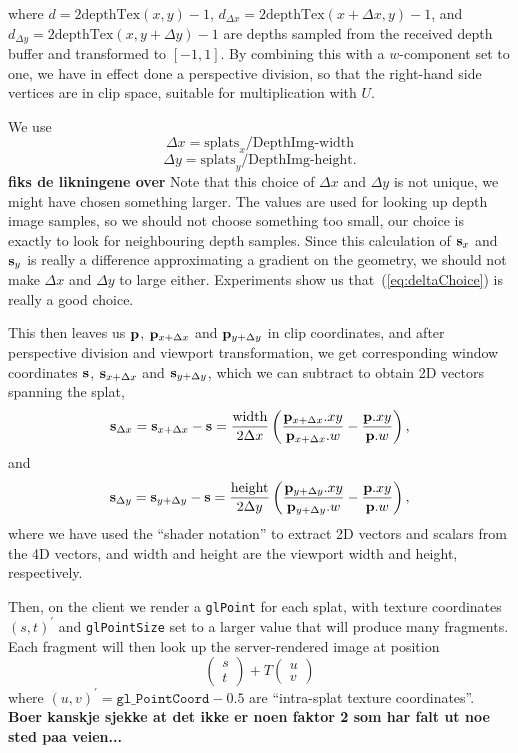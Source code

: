 where $d = 2\text{depthTex}(x, y) - 1$, $d_{\Delta x} =
2\text{depthTex}(x+\Delta x, y) - 1$, and $d_{\Delta y} = 2\text{depthTex}(x,
y+\Delta y) - 1$ are depths sampled from the received depth buffer and
transformed to $[-1, 1]$. By combining this with a $w$-component set to one, we
have in effect done a perspective division, so that the right-hand side vertices
are in clip space, suitable for multiplication with $U$.

We use
\begin{equation}
  \Delta x = \text{splats}_x / \text{DepthImg-width}
  \label{eq:deltaChoice}
\end{equation}
\[
  \Delta y = \text{splats}_y / \text{DepthImg-height}.
\]
\textbf{fiks de likningene over}
Note that this choice of $\Delta x$ and $\Delta y$ is not unique, we might have
chosen something larger. The values are used for looking up depth image samples,
so we should not choose something too small, our choice is exactly to look for
neighbouring depth samples. Since this calculation of $\mathbf{s}_x$ and $\mathbf{s}_y$ is
really a difference approximating a gradient on the geometry, we should not make
$\Delta x$ and $\Delta y$ to large either. Experiments show us
that~(\ref{eq:deltaChoice}) is really a good choice.

This then leaves us $\mathbf{p}$, $\mathbf{p}_{x+\Delta x}$ and $\mathbf{p}_{y+\Delta y}$ in clip
coordinates, and after perspective division and viewport transformation, we get
corresponding window coordinates $\mathbf{s}$, $\mathbf{s}_{x+\Delta x}$ and $\mathbf{s}_{y+\Delta
y}$, which we can subtract to obtain 2D vectors spanning the splat,
\[
  \mathbf{s}_{\Delta x} =
  \mathbf{s}_{x+\Delta x} - \mathbf{s} =
    \frac{\text{width}}{2\Delta x} \left(
        \frac{\mathbf{p}_{x+\Delta x}.xy}{\mathbf{p}_{x+\Delta x}.w} -
        \frac{\mathbf{p}.xy}{\mathbf{p}.w}
    \right),
\]
and
\[
  \mathbf{s}_{\Delta y} =
  \mathbf{s}_{y+\Delta y} - \mathbf{s} =
    \frac{\text{height}}{2\Delta y} \left(
        \frac{\mathbf{p}_{y+\Delta y}.xy}{\mathbf{p}_{y+\Delta y}.w} -
        \frac{\mathbf{p}.xy}{\mathbf{p}.w}
    \right),
\]
where we have used the ``shader notation'' to extract 2D vectors and scalars
from the 4D vectors, and $\text{width}$ and $\text{height}$ are the viewport
width and height, respectively.

Then, on the client we render a \texttt{glPoint} for each splat, with texture
coordinates $(s, t)^\prime$ and \texttt{glPointSize} set to a larger value that will
produce many fragments. Each fragment will then look up the server-rendered
image at position
\[
  \begin{pmatrix}
    s \\ t
  \end{pmatrix} +
  T 
  \begin{pmatrix}
    u \\ v
  \end{pmatrix}
\]
where $(u, v)^\prime = \texttt{gl\_PointCoord}-0.5$ are ``intra-splat texture
coordinates''. \textbf{Boer kanskje sjekke at det ikke er noen faktor 2 som har
falt ut noe sted paa veien...}

